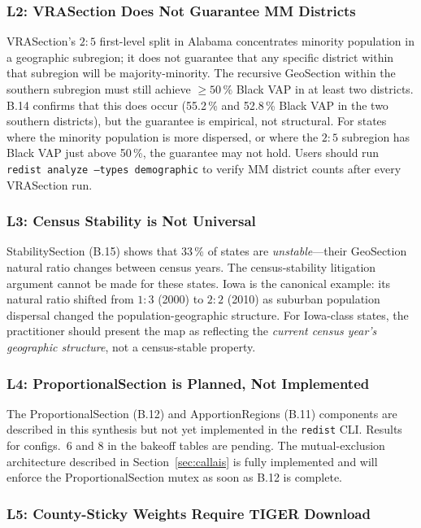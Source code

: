 \subsubsection*{L2: VRASection Does Not Guarantee MM Districts}

VRASection's $2:5$ first-level split in Alabama concentrates minority population
in a geographic subregion; it does not guarantee that any specific district
within that subregion will be majority-minority.
The recursive GeoSection within the southern subregion must still achieve $\geq 50\,\%$
Black VAP in at least two districts.
B.14 confirms that this does occur (55.2\,\% and 52.8\,\% Black VAP in the two
southern districts), but the guarantee is empirical, not structural.
For states where the minority population is more dispersed, or where the $2:5$
subregion has Black VAP just above 50\,\%, the guarantee may not hold.
Users should run \texttt{redist analyze --types demographic} to verify MM
district counts after every VRASection run.

\subsubsection*{L3: Census Stability is Not Universal}

StabilitySection (B.15) shows that 33\,\% of states are \emph{unstable}---their
GeoSection natural ratio changes between census years.
The census-stability litigation argument cannot be made for these states.
Iowa is the canonical example: its natural ratio shifted from $1:3$ (2000) to
$2:2$ (2010) as suburban population dispersal changed the population-geographic
structure.
For Iowa-class states, the practitioner should present the map as reflecting
the \emph{current census year's geographic structure}, not a census-stable
property.

\subsubsection*{L4: ProportionalSection is Planned, Not Implemented}

The ProportionalSection (B.12) and ApportionRegions (B.11) components are
described in this synthesis but not yet implemented in the \texttt{redist} CLI.
Results for configs.~6 and 8 in the bakeoff tables are pending.
The mutual-exclusion architecture described in Section~\ref{sec:callais} is
fully implemented and will enforce the ProportionalSection mutex as soon as
B.12 is complete.

\subsubsection*{L5: County-Sticky Weights Require TIGER Download}

